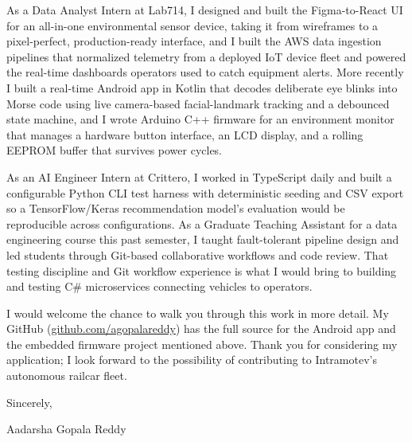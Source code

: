 \documentclass[10pt, letterpaper]{article}
\begin{document}
\vspace{\headerSpacing}
\begin{onecolentry}
	As a Data Analyst Intern at Lab714, I designed and built the Figma-to-React UI for an all-in-one environmental sensor device, taking it from wireframes to a pixel-perfect, production-ready interface, and I built the AWS data ingestion pipelines that normalized telemetry from a deployed IoT device fleet and powered the real-time dashboards operators used to catch equipment alerts. More recently I built a real-time Android app in Kotlin that decodes deliberate eye blinks into Morse code using live camera-based facial-landmark tracking and a debounced state machine, and I wrote Arduino C++ firmware for an environment monitor that manages a hardware button interface, an LCD display, and a rolling EEPROM buffer that survives power cycles.
\end{onecolentry}

\vspace{\headerSpacing}
\begin{onecolentry}
	As an AI Engineer Intern at Crittero, I worked in TypeScript daily and built a configurable Python CLI test harness with deterministic seeding and CSV export so a TensorFlow/Keras recommendation model's evaluation would be reproducible across configurations. As a Graduate Teaching Assistant for a data engineering course this past semester, I taught fault-tolerant pipeline design and led students through Git-based collaborative workflows and code review. That testing discipline and Git workflow experience is what I would bring to building and testing C\# microservices connecting vehicles to operators.
\end{onecolentry}

\vspace{\headerSpacing}
\begin{onecolentry}
	I would welcome the chance to walk you through this work in more detail. My GitHub (\href{https://github.com/agopalareddy}{github.com/agopalareddy}) has the full source for the Android app and the embedded firmware project mentioned above. Thank you for considering my application; I look forward to the possibility of contributing to Intramotev's autonomous railcar fleet.
\end{onecolentry}

\vspace{\headerSpacing}
\begin{onecolentry}
	Sincerely,
\end{onecolentry}

\vspace{\headerSpacing}
\begin{onecolentry}
	Aadarsha Gopala Reddy\\
\end{onecolentry}
\end{document}
